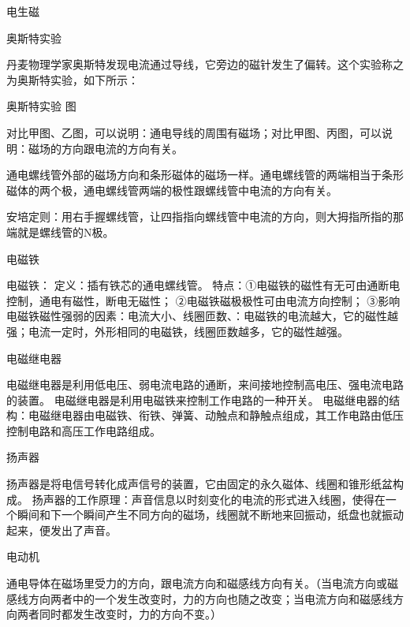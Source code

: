 \documentclass[12pt]{exam}
\renewcommand{\section}[1]{{\large\sffamily  #1} \par}
\renewcommand{\subsection}[1]{{\normalsize\sffamily  #1} \par}
\begin{document}
\section{电生磁}
\subsection{奥斯特实验}
丹麦物理学家奥斯特发现电流通过导线，它旁边的磁针发生了偏转。这个实验称之为奥斯特实验，如下所示：

奥斯特实验 图

对比甲图、乙图，可以说明：通电导线的周围有磁场；对比甲图、丙图，可以说明：磁场的方向跟电流的方向有关。

通电螺线管外部的磁场方向和条形磁体的磁场一样。通电螺线管的两端相当于条形磁体的两个极，通电螺线管两端的极性跟螺线管中电流的方向有关。

安培定则：用右手握螺线管，让四指指向螺线管中电流的方向，则大拇指所指的那端就是螺线管的N极。


\section{电磁铁}
电磁铁：
定义：插有铁芯的通电螺线管。
特点：①电磁铁的磁性有无可由通断电控制，通电有磁性，断电无磁性；
②电磁铁磁极极性可由电流方向控制；
③影响电磁铁磁性强弱的因素：电流大小、线圈匝数、：电磁铁的电流越大，它的磁性越强；电流一定时，外形相同的电磁铁，线圈匝数越多，它的磁性越强。


\section{电磁继电器}
电磁继电器是利用低电压、弱电流电路的通断，来间接地控制高电压、强电流电路的装置。
电磁继电器是利用电磁铁来控制工作电路的一种开关。
电磁继电器的结构：电磁继电器由电磁铁、衔铁、弹簧、动触点和静触点组成，其工作电路由低压控制电路和高压工作电路组成。


\section{扬声器}
扬声器是将电信号转化成声信号的装置，它由固定的永久磁体、线圈和锥形纸盆构成。
扬声器的工作原理：声音信息以时刻变化的电流的形式进入线圈，使得在一个瞬间和下一个瞬间产生不同方向的磁场，线圈就不断地来回振动，纸盘也就振动起来，便发出了声音。


\section{电动机}
通电导体在磁场里受力的方向，跟电流方向和磁感线方向有关。（当电流方向或磁感线方向两者中的一个发生改变时，力的方向也随之改变；当电流方向和磁感线方向两者同时都发生改变时，力的方向不变。）
\end{document}

